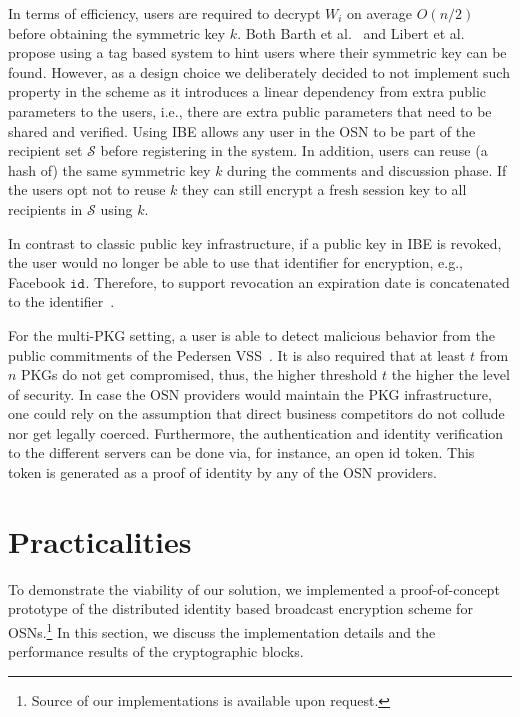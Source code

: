 \documentclass[journal]{IEEEtran}
\newcommand{\id}[1]{\ensuremath{\mathtt{id}_{#1}}}
\begin{document}
In terms of efficiency, users are required to decrypt $W_i$ on average $O\left( n/2 \right)$ before obtaining the symmetric key $k$. Both Barth et al.~\cite{BarthBonehWaters} and Libert et al.~\cite{LibertANOBE} propose using a tag based system to hint users where their symmetric key can be found. However, as a design choice we deliberately decided to not implement such property in the scheme as it introduces a linear dependency from extra public parameters to the users, i.e., there are extra public parameters that need to be shared and verified. Using IBE allows any user in the OSN to be part of the recipient set $\mathcal{S}$ before registering in the system. In addition, users can reuse (a hash of) the same symmetric key $k$ during the comments and discussion phase. If the users opt not to reuse $k$ they can still encrypt a fresh session key to all recipients in $\mathcal{S}$ using $k$.

In contrast to classic public key infrastructure, if a public key in IBE is revoked, the user would no longer be able to use that identifier for encryption, e.g., Facebook \id{}. Therefore, to support revocation an expiration date is concatenated to the identifier~\cite{BonehFranklinIBE}. 

For the multi-PKG setting, a user is able to detect malicious behavior from the public commitments of the Pedersen VSS~\cite{Pedersen:1991:NIS:646756.705507}. It is also required that at least $t$ from $n$ PKGs do not get compromised, thus, the higher threshold $t$ the higher the level of security. In case the OSN providers would maintain the PKG infrastructure, one could rely on the assumption that direct business competitors do not collude nor get legally coerced. Furthermore, the authentication and identity verification to the different servers can be done via, for instance, an open id token. This token is generated as a proof of identity by any of the OSN providers.


\section{Practicalities}\label{sec:impl}
To demonstrate the viability of our solution, we implemented a proof-of-concept prototype of the distributed identity based broadcast encryption scheme for OSNs.\footnote{Source of our implementations is available upon request.} In this section, we discuss the implementation details and the performance results of the cryptographic blocks.
\end{document}
